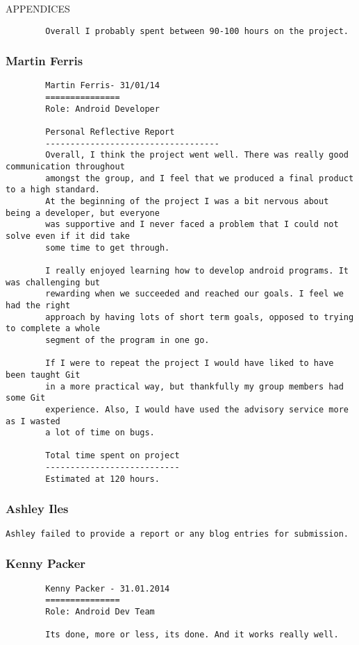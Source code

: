 \documentclass{article}
\begin{document}
\begin{section}{APPENDICES}
\begin{verbatim}
		Overall I probably spent between 90-100 hours on the project.
		\end{verbatim}
		
		\clearpage
		\subsubsection{Martin Ferris}
		\begin{verbatim}
		Martin Ferris- 31/01/14 
		===============
		Role: Android Developer

		Personal Reflective Report
		-----------------------------------
		Overall, I think the project went well. There was really good communication throughout
		amongst the group, and I feel that we produced a final product to a high standard.
		At the beginning of the project I was a bit nervous about being a developer, but everyone
		was supportive and I never faced a problem that I could not solve even if it did take 
		some time to get through.

		I really enjoyed learning how to develop android programs. It was challenging but 
		rewarding when we succeeded and reached our goals. I feel we had the right 
		approach by having lots of short term goals, opposed to trying to complete a whole 
		segment of the program in one go.

		If I were to repeat the project I would have liked to have been taught Git 
		in a more practical way, but thankfully my group members had some Git 
		experience. Also, I would have used the advisory service more as I wasted 
		a lot of time on bugs.

		Total time spent on project
		---------------------------
		Estimated at 120 hours.
		\end{verbatim}
		
		\clearpage
		\subsubsection{Ashley Iles}
		{\tt Ashley failed to provide a report or any blog entries for submission.}
		
		\clearpage
		\subsubsection{Kenny Packer}
		\begin{verbatim}
		Kenny Packer - 31.01.2014
		===============
		Role: Android Dev Team

		Its done, more or less, its done. And it works really well.


\end{verbatim}
\end{section}
\end{document}
